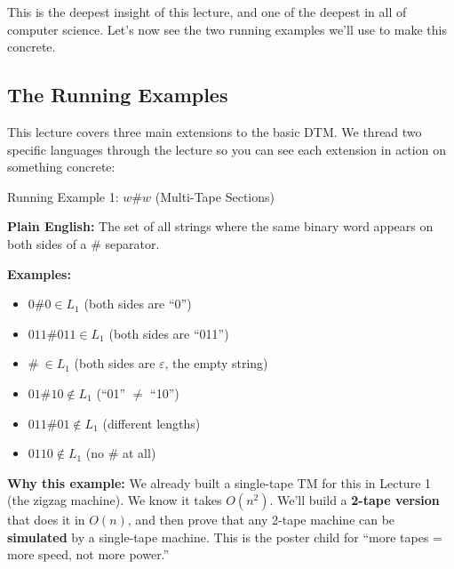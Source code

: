 This is the deepest insight of this lecture, and one of the deepest in all of computer science. Let's now see the two running examples we'll use to make this concrete.

\subsection{The Running Examples}
\label{subsec:running-examples}

This lecture covers three main extensions to the basic DTM. We thread two specific languages through the lecture so you can see each extension in action on something concrete:

\begin{definitionbox}{Running Example 1: $w\#w$ (Multi-Tape Sections)}

\textbf{Plain English:} The set of all strings where the same binary word appears on both sides of a \# separator.

\textbf{Examples:}
\begin{itemize}[nosep]
\item $0\#0 \in L_1$ \quad (both sides are ``0'')
\item $011\#011 \in L_1$ \quad (both sides are ``011'')
\item $\#\  \in L_1$ \quad (both sides are $\varepsilon$, the empty string)
\item $01\#10 \notin L_1$ \quad (``01'' $\neq$ ``10'')
\item $011\#01 \notin L_1$ \quad (different lengths)
\item $0110 \notin L_1$ \quad (no \# at all)
\end{itemize}

\textbf{Why this example:} We already built a single-tape TM for this in Lecture 1 (the zigzag machine). We know it takes $O(n^2)$. We'll build a \textbf{2-tape version} that does it in $O(n)$, and then prove that any 2-tape machine can be \textbf{simulated} by a single-tape machine. This is the poster child for ``more tapes = more speed, not more power.''
\end{definitionbox}

